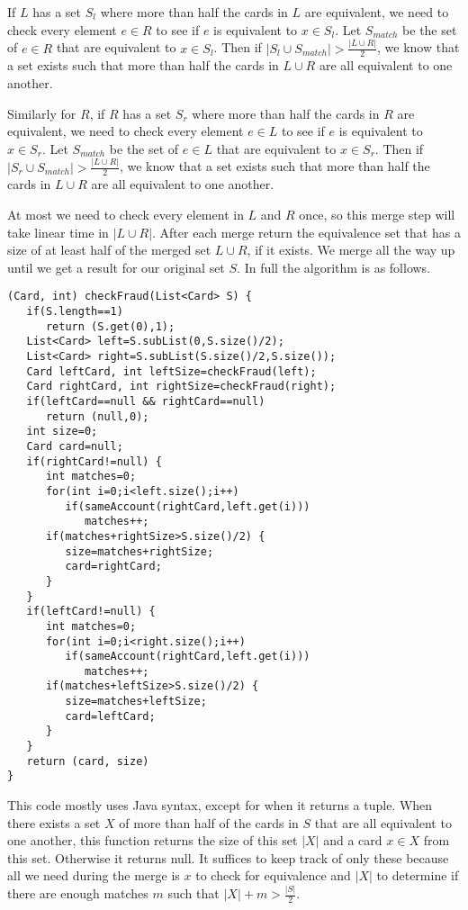 \documentclass[12pt]{article}
\begin{document}
If \(L\) has a set \(S_l\) where more than half the cards in \(L\) are equivalent, we need to
check every element \(e\in R\) to see if \(e\) is equivalent to \(x\in S_l\). Let \(S_{match}\) be the set of \(e\in R\) that are equivalent to
\(x\in S_l\). Then if \(|S_l\cup S_{match}|>\frac{|L\cup R|}{2}\), we know that a set exists such that more than half the cards in \(L\cup R\) are all
equivalent to one another.

Similarly for \(R\), if \(R\) has a set \(S_r\) where more than half the cards in \(R\) are equivalent, we need to
check every element \(e\in L\) to see if \(e\) is equivalent to \(x\in S_r\). Let \(S_{match}\) be the set of \(e\in L\) that are equivalent to
\(x\in S_r\). Then if \(|S_r\cup S_{match}|>\frac{|L\cup R|}{2}\), we know that a set exists such that more than half the cards in \(L\cup R\) are all
equivalent to one another.

At most we need to check every element in \(L\) and \(R\) once, so this merge step will take linear time in \(|L\cup R|\).
After each merge return the equivalence set that has a size of at least half of the merged set \(L\cup R\), if it exists. We merge all the way up
until we get a result for our original set \(S\). In full the algorithm is as follows.

\begin{verbatim}
(Card, int) checkFraud(List<Card> S) {
   if(S.length==1)
      return (S.get(0),1);
   List<Card> left=S.subList(0,S.size()/2);
   List<Card> right=S.subList(S.size()/2,S.size());
   Card leftCard, int leftSize=checkFraud(left);
   Card rightCard, int rightSize=checkFraud(right);
   if(leftCard==null && rightCard==null)
      return (null,0);
   int size=0;
   Card card=null;
   if(rightCard!=null) {
      int matches=0;
      for(int i=0;i<left.size();i++)
         if(sameAccount(rightCard,left.get(i)))
            matches++;
      if(matches+rightSize>S.size()/2) {
         size=matches+rightSize;
         card=rightCard;
      }
   }
   if(leftCard!=null) {
      int matches=0;
      for(int i=0;i<right.size();i++)
         if(sameAccount(rightCard,left.get(i)))
            matches++;
      if(matches+leftSize>S.size()/2) {
         size=matches+leftSize;
         card=leftCard;
      }
   }
   return (card, size)
}
\end{verbatim}

This code mostly uses Java syntax, except for when it returns a tuple. When there exists
a set \(X\) of more than half of the cards in \(S\) that are all equivalent to one another, this function returns
the size of this set \(|X|\) and a card \(x\in X\) from this set. Otherwise it returns null. It suffices to keep track of only these because
all we need during the merge is \(x\) to check for equivalence and \(|X|\) to determine if there are enough matches \(m\) such
that \(|X|+m>\frac{|S|}{2}\).
\end{document}
